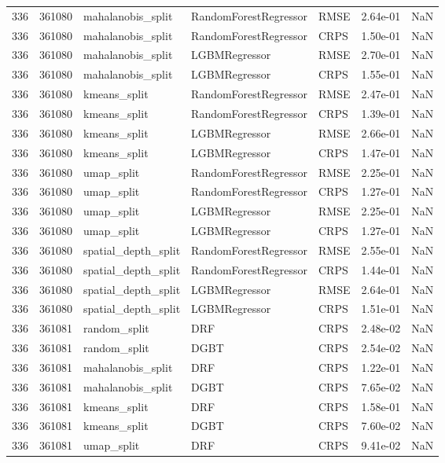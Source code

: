 \begin{tabular}{rrlllrr}
336 & 361080 & mahalanobis\_split & RandomForestRegressor & RMSE & 2.64e-01 & NaN \\
336 & 361080 & mahalanobis\_split & RandomForestRegressor & CRPS & 1.50e-01 & NaN \\
336 & 361080 & mahalanobis\_split & LGBMRegressor & RMSE & 2.70e-01 & NaN \\
336 & 361080 & mahalanobis\_split & LGBMRegressor & CRPS & 1.55e-01 & NaN \\
336 & 361080 & kmeans\_split & RandomForestRegressor & RMSE & 2.47e-01 & NaN \\
336 & 361080 & kmeans\_split & RandomForestRegressor & CRPS & 1.39e-01 & NaN \\
336 & 361080 & kmeans\_split & LGBMRegressor & RMSE & 2.66e-01 & NaN \\
336 & 361080 & kmeans\_split & LGBMRegressor & CRPS & 1.47e-01 & NaN \\
336 & 361080 & umap\_split & RandomForestRegressor & RMSE & 2.25e-01 & NaN \\
336 & 361080 & umap\_split & RandomForestRegressor & CRPS & 1.27e-01 & NaN \\
336 & 361080 & umap\_split & LGBMRegressor & RMSE & 2.25e-01 & NaN \\
336 & 361080 & umap\_split & LGBMRegressor & CRPS & 1.27e-01 & NaN \\
336 & 361080 & spatial\_depth\_split & RandomForestRegressor & RMSE & 2.55e-01 & NaN \\
336 & 361080 & spatial\_depth\_split & RandomForestRegressor & CRPS & 1.44e-01 & NaN \\
336 & 361080 & spatial\_depth\_split & LGBMRegressor & RMSE & 2.64e-01 & NaN \\
336 & 361080 & spatial\_depth\_split & LGBMRegressor & CRPS & 1.51e-01 & NaN \\
336 & 361081 & random\_split & DRF & CRPS & 2.48e-02 & NaN \\
336 & 361081 & random\_split & DGBT & CRPS & 2.54e-02 & NaN \\
336 & 361081 & mahalanobis\_split & DRF & CRPS & 1.22e-01 & NaN \\
336 & 361081 & mahalanobis\_split & DGBT & CRPS & 7.65e-02 & NaN \\
336 & 361081 & kmeans\_split & DRF & CRPS & 1.58e-01 & NaN \\
336 & 361081 & kmeans\_split & DGBT & CRPS & 7.60e-02 & NaN \\
336 & 361081 & umap\_split & DRF & CRPS & 9.41e-02 & NaN \\

\end{tabular}
